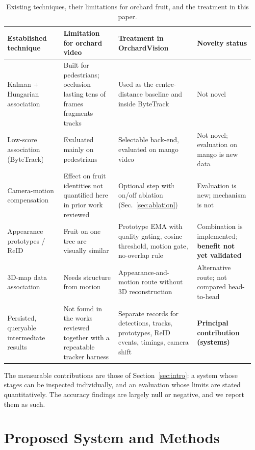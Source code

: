 \documentclass[11pt,a4paper]{article}
\begin{document}
\begin{table}[t]
\caption{Existing techniques, their limitations for orchard fruit, and the treatment in this paper.}\label{tab:novelty}
\centering\normalsize
\begin{tabular}{p{2.6cm}p{3.8cm}p{4.2cm}p{3.6cm}}
\toprule
Established technique & Limitation for orchard video & Treatment in OrchardVision & Novelty status\\
\midrule
Kalman + Hungarian association~\cite{bewley2016sort} & Built for pedestrians; occlusion lasting tens of frames fragments tracks & Used as the centre-distance baseline and inside ByteTrack & Not novel\\
Low-score association (ByteTrack)~\cite{zhang2022bytetrack} & Evaluated mainly on pedestrians & Selectable back-end, evaluated on mango video & Not novel; evaluation on mango is new data\\
Camera-motion compensation~\cite{aharon2022botsort} & Effect on fruit identities not quantified here in prior work reviewed & Optional step with on/off ablation (Sec.~\ref{sec:ablation}) & Evaluation is new; mechanism is not\\
Appearance prototypes / ReID~\cite{wojke2017deepsort,hermans2017triplet} & Fruit on one tree are visually similar & Prototype EMA with quality gating, cosine threshold, motion gate, no-overlap rule & Combination is implemented; \textbf{benefit not yet validated}\\
3D-map data association~\cite{liu2019monocular} & Needs structure from motion & Appearance-and-motion route without 3D reconstruction & Alternative route; not compared head-to-head\\
\midrule
Persisted, queryable intermediate results & Not found in the works reviewed together with a repeatable tracker harness & Separate records for detections, tracks, prototypes, ReID events, timings, camera shift & \textbf{Principal contribution (systems)}\\
\bottomrule
\end{tabular}
\end{table}

The measurable contributions are those of Section~\ref{sec:intro}: a system whose stages can be inspected individually, and an evaluation whose limits are stated quantitatively. The accuracy findings are largely null or negative, and we report them as such.

\section{Proposed System and Methods}\label{sec:methods}
\end{document}
